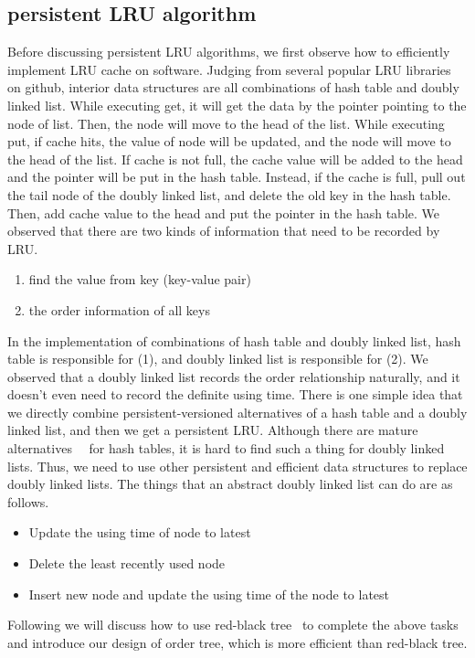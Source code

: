\documentclass[conference]{IEEEtran}
\begin{document}
\subsection{persistent LRU algorithm}
Before discussing persistent LRU algorithms, we first observe how to efficiently implement LRU cache on software. Judging from several popular LRU libraries on github, interior data structures are all combinations of hash table and doubly linked list.
While executing get, it will get the data by the pointer pointing to the node of list. Then, the node will move to the head of the list. While executing put, if cache hits, the value of node will be updated, and the node will move to the head of the list. If cache is not full, the cache value will be added to the head and the pointer will be put in the hash table. Instead, if the cache is full, pull out the tail node of the doubly linked list, and delete the old key in the hash table. Then, add cache value to the head and put the pointer in the hash table.
We observed that there are two kinds of information that need to be recorded by LRU.
\begin{enumerate}
  \item find the value from key (key-value pair)
  \item the order information of all keys
\end{enumerate}
In the implementation of combinations of hash table and doubly linked list, hash table is responsible for (1), and doubly linked list is responsible for (2). We observed that a doubly linked list records the order relationship naturally, and it doesn't even need to record the definite using time.
There is one simple idea that we directly combine persistent-versioned alternatives of a hash table and a doubly linked list, and then we get a persistent LRU. Although there are mature alternatives~\cite{b5}~\cite{b6} for hash tables, it is hard to find such a thing for doubly linked lists.
Thus, we need to use other persistent and efficient data structures to replace doubly linked lists. The things that an abstract doubly linked list can do are as follows.
\begin{itemize}
\item Update the using time of node to latest
\item Delete the least recently used node
\item Insert new node and update the using time of the node to latest
\end{itemize}
Following we will discuss how to use red-black tree~\cite{b7} to complete the above tasks and introduce our design of order tree, which is more efficient than red-black tree.
\end{document}
